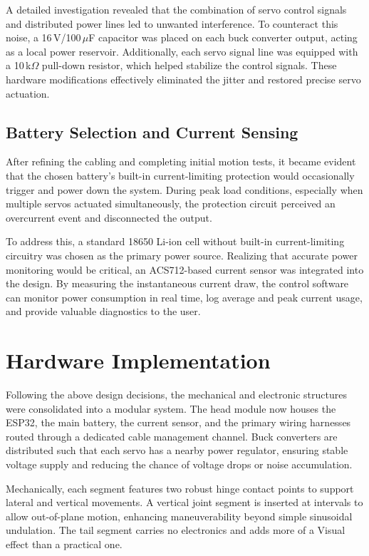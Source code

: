 \documentclass[12pt,a4paper]{report}
\begin{document}
A detailed investigation revealed that the combination of servo control signals and distributed power lines led to unwanted interference. To counteract this noise, a 16\,V/100\,$\mu$F capacitor was placed on each buck converter output, acting as a local power reservoir. Additionally, each servo signal line was equipped with a 10\,k$\Omega$ pull-down resistor, which helped stabilize the control signals. These hardware modifications effectively eliminated the jitter and restored precise servo actuation.

\subsection{Battery Selection and Current Sensing}
After refining the cabling and completing initial motion tests, it became evident that the chosen battery’s built-in current-limiting protection would occasionally trigger and power down the system. During peak load conditions, especially when multiple servos actuated simultaneously, the protection circuit perceived an overcurrent event and disconnected the output. 

To address this, a standard 18650 Li-ion cell without built-in current-limiting circuitry was chosen as the primary power source. Realizing that accurate power monitoring would be critical, an ACS712-based current sensor was integrated into the design. By measuring the instantaneous current draw, the control software can monitor power consumption in real time, log average and peak current usage, and provide valuable diagnostics to the user. 

\section{Hardware Implementation}
Following the above design decisions, the mechanical and electronic structures were consolidated into a modular system. The head module now houses the ESP32, the main battery, the current sensor, and the primary wiring harnesses routed through a dedicated cable management channel. Buck converters are distributed such that each servo has a nearby power regulator, ensuring stable voltage supply and reducing the chance of voltage drops or noise accumulation.

Mechanically, each segment features two robust hinge contact points to support lateral and vertical movements. A vertical joint segment is inserted at intervals to allow out-of-plane motion, enhancing maneuverability beyond simple sinusoidal undulation. The tail segment carries no electronics and adds more of a Visual effect than a practical one.
\end{document}
